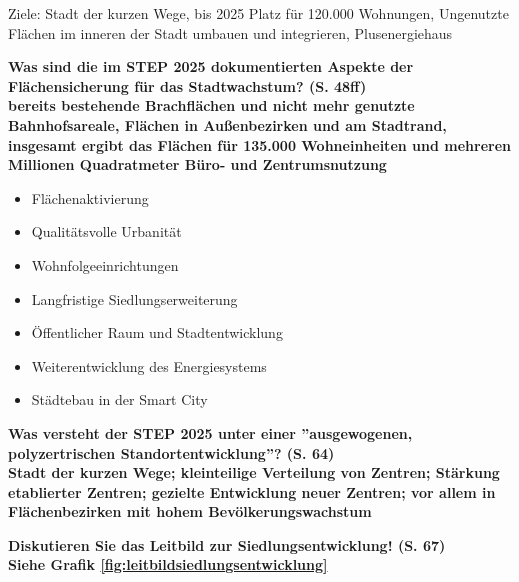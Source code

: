 \documentclass[]{article}
\newenvironment{question}{\vspace{8mm}\noindent\bfseries}{\\}
\begin{document}
Ziele: Stadt der kurzen Wege, bis 2025 Platz für 120.000 Wohnungen, Ungenutzte Flächen im inneren der Stadt umbauen und integrieren, Plusenergiehaus

\begin{question}
	Was sind die im STEP 2025 dokumentierten Aspekte der Flächensicherung für das Stadtwachstum? (S. 48ff)
\end{question}
bereits bestehende Brachflächen und nicht mehr genutzte Bahnhofsareale, Flächen in Außenbezirken und am Stadtrand, insgesamt ergibt das Flächen für 135.000 Wohneinheiten und mehreren Millionen Quadratmeter Büro- und Zentrumsnutzung

\begin{itemize}
	\item Flächenaktivierung
	\item Qualitätsvolle Urbanität
	\item Wohnfolgeeinrichtungen
	\item Langfristige Siedlungserweiterung
	\item Öffentlicher Raum und Stadtentwicklung
	\item Weiterentwicklung des Energiesystems
	\item Städtebau in der Smart City
\end{itemize}

\begin{question}
	Was versteht der STEP 2025 unter einer ''ausgewogenen, polyzertrischen Standortentwicklung''? (S. 64)
\end{question}
Stadt der kurzen Wege; kleinteilige Verteilung von Zentren; Stärkung etablierter Zentren; gezielte Entwicklung neuer Zentren; vor allem in Flächenbezirken mit hohem Bevölkerungswachstum

\begin{question}
	Diskutieren Sie das Leitbild zur Siedlungsentwicklung! (S. 67)
\end{question}
Siehe Grafik \ref{fig:leitbildsiedlungsentwicklung}
\end{document}
